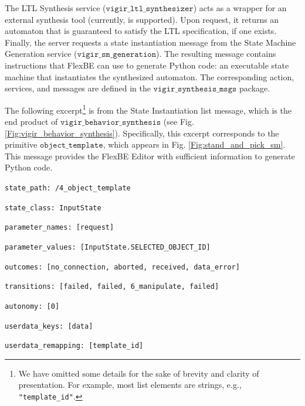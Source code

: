 The LTL Synthesis service ($\mathtt{vigir\_ltl\_synthesizer}$) acts as a wrapper for an external synthesis tool (currently, \cite{SLUGS} is supported).
Upon request, it returns an automaton that is guaranteed to satisfy the LTL specification, if one exists.
Finally, the server requests a state instantiation message from the State Machine Generation service ($\mathtt{vigir\_sm\_generation}$).
The resulting message contains instructions that FlexBE can use to generate Python code: an executable state machine that instantiates the synthesized automaton.
The corresponding action, services, and messages are defined in the $\mathtt{vigir\_synthesis\_msgs}$ package.

The following excerpt\footnote{We have omitted some details for the sake of brevity and clarity of presentation. For example, most list elements are strings, e.g., \scriptsize{\texttt{"template\_id"}}.}
 is from the State Instantiation list message, which is the end product of $\mathtt{vigir\_behavior\_synthesis}$ (see Fig. \ref{Fig:vigir_behavior_synthesis}).
Specifically, this excerpt corresponds to the primitive $\mathtt{object\_template}$, which appears in Fig. \ref{Fig:stand_and_pick_sm}.
This message provides the FlexBE Editor with sufficient information to generate Python code.

\begin{description}
\setlength{\itemindent}{-.4in}
	\item \scriptsize{\texttt{state\_path: /4\_object\_template}}
	\item \scriptsize{\texttt{state\_class: InputState}}
	\item \scriptsize{\texttt{parameter\_names: [request]}}
	\item \scriptsize{\texttt{parameter\_values: [InputState.SELECTED\_OBJECT\_ID]}}
	\item \scriptsize{\texttt{outcomes: [no\_connection, aborted, received, data\_error]}}
	\item \scriptsize{\texttt{transitions: [failed, failed, 6\_manipulate, failed]}}
	\item \scriptsize{\texttt{autonomy: [0]}}
	\item \scriptsize{\texttt{userdata\_keys: [data]}}
	\item \scriptsize{\texttt{userdata\_remapping: [template\_id]}}
\end{description}


